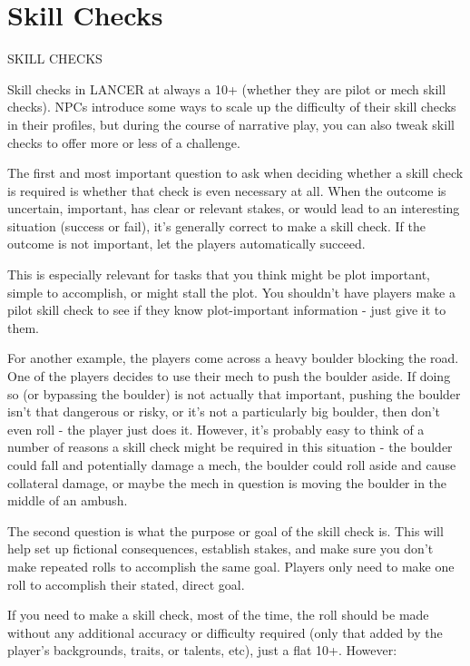 \chapter{Skill Checks}

                                           SKILL CHECKS

Skill checks in LANCER at always a 10+ (whether they are pilot or mech skill checks). NPCs
introduce some ways to scale up the difficulty of their skill checks in their profiles, but during the
course of narrative play, you can also tweak skill checks to offer more or less of a challenge.


The first and most important question to ask when deciding whether a skill check is
required is whether that check is even necessary at all. When the outcome is uncertain,
important, has clear or relevant stakes, or would lead to an interesting situation (success or fail),
it’s generally correct to make a skill check. If the outcome is not important, let the players
automatically succeed.


This is especially relevant for tasks that you think might be plot important, simple to accomplish,
or might stall the plot. You shouldn’t have players make a pilot skill check to see if they know
plot-important information - just give it to them.


For another example, the players come across a heavy boulder blocking the road. One of the
players decides to use their mech to push the boulder aside. If doing so (or bypassing the
boulder) is not actually that important, pushing the boulder isn’t that dangerous or risky, or it’s
not a particularly big boulder, then don’t even roll - the player just does it. However, it’s probably
easy to think of a number of reasons a skill check might be required in this situation - the boulder
could fall and potentially damage a mech, the boulder could roll aside and cause collateral
damage, or maybe the mech in question is moving the boulder in the middle of an ambush.


The second question is what the purpose or goal of the skill check is. This will help set up
fictional consequences, establish stakes, and make sure you don’t make repeated rolls to
accomplish the same goal. Players only need to make one roll to accomplish their stated, direct
goal.


If you need to make a skill check, most of the time, the roll should be made without any
additional accuracy or difficulty required (only that added by the player’s backgrounds, traits, or
talents, etc), just a flat 10+. However:


